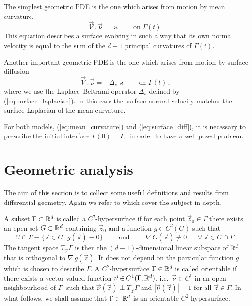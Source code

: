 The simplest geometric PDE is the one which arises from motion by mean
curvature,
\begin{equation}\label{eq:mean_curvature}
\vec{\mathcal{V}}\,.\,\vec\nu=\varkappa\qquad\mbox{on }\Gamma(t).
\end{equation}
This equation describes a surface evolving in such a way that its own normal
velocity is equal to the sum of the $d-1$ principal curvatures of $\Gamma(t)$.

Another important geometric PDE is the one which arises from motion by
surface diffusion
\begin{equation}\label{eq:surface_diff}
\vec{\mathcal{V}}\,.\,\vec\nu=-\Delta_s \varkappa \qquad\mbox{on }\Gamma(t)\,,
\end{equation}
where we use the Laplace--Beltrami operator $\Delta_s$ defined by
(\ref{eq:surface_laplacian}). In this case the surface normal velocity matches
the surface Laplacian of the mean curvature.

For both models, (\ref{eq:mean_curvature}) and (\ref{eq:surface_diff}), it is
necessary to prescribe the initial interface $\Gamma(0)=\Gamma_0$ in order to
have a well posed problem.

\section[Geometric Analysis]{Geometric analysis}
The aim of this section is to collect some useful definitions and results from
differential geometry. Again we refer to \cite{DeckelnickDE05} which cover the
subject in depth.

A subset $\Gamma \subset {\mathbb R}^d$ is called a $C^2$-hypersurface if for each point
$\vec z_0 \in \Gamma$ there exists an open set $G \subset {\mathbb R}^d$ containing
$\vec z_0$ and a function $g \in C^2(G)$ such that
\begin{equation}
G \cap \Gamma = \{ \vec z \in G \, | \, g(\vec z) = 0 \}
\qquad \mbox{ and } \qquad \nabla \, G(\vec z) \neq 0\,,
\quad \forall\ \vec z \in G \cap \Gamma \, .
\end{equation}
The tangent space $T_{\vec z} \Gamma$ is then the $(d-1)$-dimensional linear
subspace of ${\mathbb R}^d$ that is orthogonal to $\nabla \, g(\vec z)$. It does not
depend on the particular function $g$ which is chosen to describe $\Gamma$. A
$C^2$-hypersurface $\Gamma \in {\mathbb R}^d$ is called orientable if there exists a
vector-valued function $\vec\nu \in C^1(\Gamma, {\mathbb R}^d)$, i.e.~$\vec\nu \in C^1$
in an open neighbourhood of $\Gamma$, such that $\vec\nu(\vec z) \perp T_{\vec
z} \Gamma$ and $|\vec{\nu}(\vec z)| = 1$ for all $\vec z \in \Gamma$. In what
follows, we shall assume that $\Gamma \subset {\mathbb R}^d$ is an orientable
$C^2$-hypersurface.

